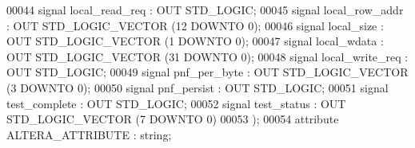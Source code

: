 \begin{DoxyCode}
00044                  \textcolor{keywordflow}{signal} \textcolor{vhdlchar}{local_read_req} \textcolor{vhdlchar}{:} \textcolor{keywordflow}{OUT} \textcolor{comment}{STD\_LOGIC};
00045                  \textcolor{keywordflow}{signal} \textcolor{vhdlchar}{local_row_addr} \textcolor{vhdlchar}{:} \textcolor{keywordflow}{OUT} \textcolor{comment}{STD\_LOGIC\_VECTOR} \textcolor{vhdlchar}{(}\textcolor{vhdllogic}{}\textcolor{vhdllogic}{12} \textcolor{keywordflow}{DOWNTO} \textcolor{vhdllogic}{}\textcolor{vhdllogic}{0}\textcolor{vhdlchar}{)};
00046                  \textcolor{keywordflow}{signal} \textcolor{vhdlchar}{local_size} \textcolor{vhdlchar}{:} \textcolor{keywordflow}{OUT} \textcolor{comment}{STD\_LOGIC\_VECTOR} \textcolor{vhdlchar}{(}\textcolor{vhdllogic}{}\textcolor{vhdllogic}{1} \textcolor{keywordflow}{DOWNTO} \textcolor{vhdllogic}{}\textcolor{vhdllogic}{0}\textcolor{vhdlchar}{)};
00047                  \textcolor{keywordflow}{signal} \textcolor{vhdlchar}{local_wdata} \textcolor{vhdlchar}{:} \textcolor{keywordflow}{OUT} \textcolor{comment}{STD\_LOGIC\_VECTOR} \textcolor{vhdlchar}{(}\textcolor{vhdllogic}{}\textcolor{vhdllogic}{31} \textcolor{keywordflow}{DOWNTO} \textcolor{vhdllogic}{}\textcolor{vhdllogic}{0}\textcolor{vhdlchar}{)};
00048                  \textcolor{keywordflow}{signal} \textcolor{vhdlchar}{local_write_req} \textcolor{vhdlchar}{:} \textcolor{keywordflow}{OUT} \textcolor{comment}{STD\_LOGIC};
00049                  \textcolor{keywordflow}{signal} \textcolor{vhdlchar}{pnf_per_byte} \textcolor{vhdlchar}{:} \textcolor{keywordflow}{OUT} \textcolor{comment}{STD\_LOGIC\_VECTOR} \textcolor{vhdlchar}{(}\textcolor{vhdllogic}{}\textcolor{vhdllogic}{3} \textcolor{keywordflow}{DOWNTO} \textcolor{vhdllogic}{}\textcolor{vhdllogic}{0}\textcolor{vhdlchar}{)};
00050                  \textcolor{keywordflow}{signal} \textcolor{vhdlchar}{pnf_persist} \textcolor{vhdlchar}{:} \textcolor{keywordflow}{OUT} \textcolor{comment}{STD\_LOGIC};
00051                  \textcolor{keywordflow}{signal} \textcolor{vhdlchar}{test_complete} \textcolor{vhdlchar}{:} \textcolor{keywordflow}{OUT} \textcolor{comment}{STD\_LOGIC};
00052                  \textcolor{keywordflow}{signal} \textcolor{vhdlchar}{test_status} \textcolor{vhdlchar}{:} \textcolor{keywordflow}{OUT} \textcolor{comment}{STD\_LOGIC\_VECTOR} \textcolor{vhdlchar}{(}\textcolor{vhdllogic}{}\textcolor{vhdllogic}{7} \textcolor{keywordflow}{DOWNTO} \textcolor{vhdllogic}{}\textcolor{vhdllogic}{0}\textcolor{vhdlchar}{)}
00053               \textcolor{vhdlchar}{)};
00054 \textcolor{keywordflow}{attribute} \textcolor{vhdlchar}{ALTERA_ATTRIBUTE} \textcolor{vhdlchar}{:} \textcolor{comment}{string};

\end{DoxyCode}
